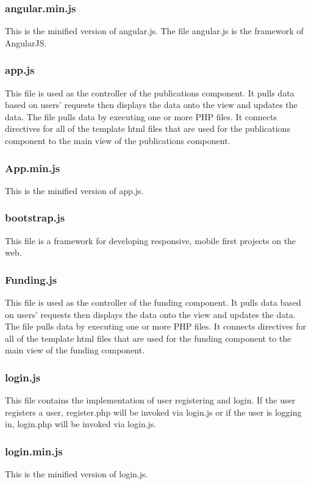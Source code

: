 \documentclass[onecolumn]{IEEEtran}
\begin{document}
\subsubsection{angular.min.js}
This is the minified version of angular.js. The file angular.js is the framework of AngularJS. 

\subsubsection{app.js}
This file is used as the controller of the publications component. It pulls data based on users' requests then displays the data onto the view and updates the data. The file pulls data by executing one or more PHP files. It connects directives for all of the template html files that are used for the publications component to the main view of the publications component. 

\subsubsection{App.min.js}
This is the minified version of app.js. 

\subsubsection{bootstrap.js}
This file is a framework for developing responsive, mobile first projects on the web. 

\subsubsection{Funding.js}
This file is used as the controller of the funding component. It pulls data based on users' requests then displays the data onto the view and updates the data. The file pulls data by executing one or more PHP files. It connects directives for all of the template html files that are used for the funding component to the main view of the funding component. 

\subsubsection{login.js}
This file contains the implementation of user registering and login. If the user registers a user, register.php will be invoked via login.js or if the user is logging in, login.php will be invoked via login.js. 

\subsubsection{login.min.js}
This is the minified version of login.js. 
\end{document}
